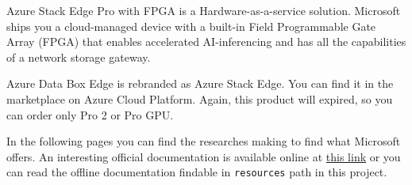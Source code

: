 \documentclass[a4paper]{article}
\begin{document}
    \noindent
    Azure Stack Edge Pro with FPGA is a Hardware-as-a-service solution. Microsoft ships you a cloud-managed device with a built-in Field Programmable Gate Array (FPGA) that enables accelerated AI-inferencing and has all the capabilities of a network storage gateway.\newline

    \noindent
    Azure Data Box Edge is rebranded as Azure Stack Edge. You can find it in the marketplace on Azure Cloud Platform. Again, this product will expired, so you can order only Pro 2 or Pro GPU.\newline

    \noindent
    In the following pages you can find the researches making to find what Microsoft offers. An interesting official documentation is available online at \href{https://learn.microsoft.com/en-us/azure/databox-online/azure-stack-edge-overview}{this link} or you can read the offline documentation findable in \texttt{resources} path in this project.
\end{document}
